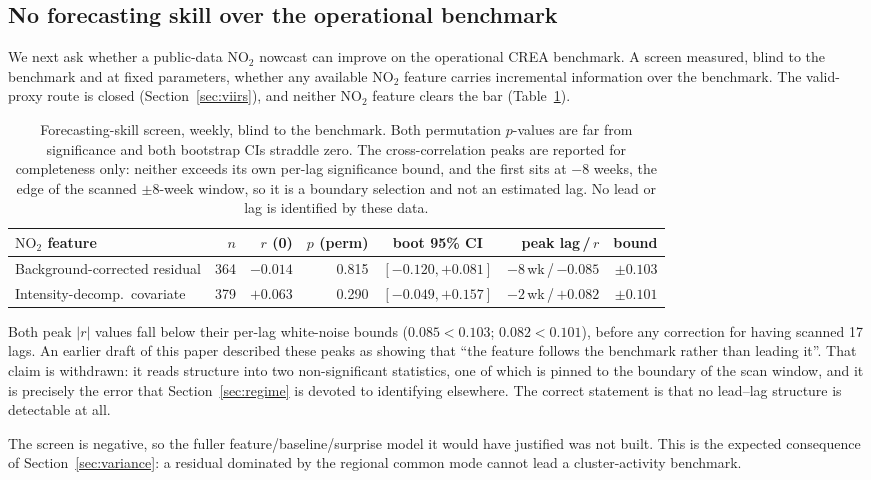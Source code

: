 \documentclass[11pt,a4paper]{article}
\providecommand{\ce}[1]{\ensuremath{\mathrm{#1}}}
\begin{document}
\subsection{No forecasting skill over the operational benchmark}
\label{sec:nowcast}

We next ask whether a public-data \ce{NO_2} nowcast can improve on the operational CREA
benchmark. A screen measured, blind to the benchmark and at fixed parameters, whether any
available \ce{NO_2} feature carries incremental information over the benchmark. The valid-proxy
route is closed (Section~\ref{sec:viirs}), and neither \ce{NO_2} feature clears the bar
(Table~\ref{tab:nowcast}).

\begin{table}[t]
\centering
\caption{Forecasting-skill screen, weekly, blind to the benchmark. Both permutation $p$-values are
far from significance and both bootstrap CIs straddle zero. The cross-correlation peaks are
reported for completeness only: neither exceeds its own per-lag significance bound, and the
first sits at $-8$ weeks, the edge of the scanned $\pm8$-week window, so it is a boundary
selection and not an estimated lag. No lead or lag is identified by these data.}
\label{tab:nowcast}
\small
\begin{tabular}{@{}lrrrcrr@{}}
\toprule
\ce{NO_2} feature & $n$ & $r$ (0) & $p$ (perm) & boot 95\% CI & peak lag\,/\,$r$ & bound \\
\midrule
Background-corrected residual & 364 & $-0.014$ & 0.815 & $[-0.120,+0.081]$ & $-8$\,wk\,/\,$-0.085$ & $\pm0.103$ \\
Intensity-decomp.\ covariate & 379 & $+0.063$ & 0.290 & $[-0.049,+0.157]$ & $-2$\,wk\,/\,$+0.082$ & $\pm0.101$ \\
\bottomrule
\end{tabular}
\end{table}

Both peak $|r|$ values fall below their per-lag white-noise bounds ($0.085<0.103$;
$0.082<0.101$), before any correction for having scanned 17 lags. An earlier draft of this paper
described these peaks as showing that ``the feature follows the benchmark rather than leading
it''. That claim is withdrawn: it reads structure into two non-significant statistics, one of
which is pinned to the boundary of the scan window, and it is precisely the error that
Section~\ref{sec:regime} is devoted to identifying elsewhere. The correct statement is that no
lead--lag structure is detectable at all.

The screen is negative, so the fuller feature/baseline/surprise model it would have justified was
not built. This is the expected consequence of Section~\ref{sec:variance}: a residual dominated
by the regional common mode cannot lead a cluster-activity benchmark.
\end{document}
